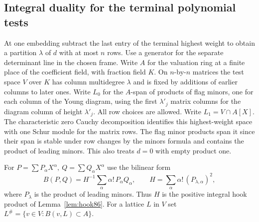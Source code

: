 \documentclass[a4paper,11pt]{article}
\theoremstyle{definition}
\theoremstyle{remark}
\numberwithin{equation}{section}
\begin{document}
\subsection{Integral duality for the terminal polynomial tests}\label{nav:V-66}
At one embedding subtract the last entry of the terminal
highest weight to obtain a partition \(\lambda\) of \(d\)
with at most \(n\) rows. Use a generator for the separate
determinant line in the chosen frame. Write \(A\) for the
valuation ring at a finite place of the coefficient field,
with fraction field \(K\). On \(n\)-by-\(n\) matrices the
test space \(V\) over \(K\) has column multidegree
\(\lambda\) and is fixed by additions of earlier columns to
later ones. Write \(L_0\) for the \(A\)-span of products of
flag minors, one for each column of the Young diagram,
using the first \(\lambda'_j\) matrix columns for the
diagram column of height \(\lambda'_j\). All row choices
are allowed. Write \(L_1=V\cap A[X]\). The characteristic
zero Cauchy decomposition identifies this highest-weight
space with one Schur module for the matrix rows. The flag
minor products span it since their span is stable under row
changes by the minors formula and contains the product of
leading minors. This also treats \(d=0\) with empty product one.

For \(P=\sum P_\alpha X^\alpha,\ Q=\sum Q_\alpha X^\alpha\)
use the bilinear form
\[
 B(P,Q)=H^{-1}\sum_\alpha \alpha!\,P_\alpha Q_\alpha,
 \qquad H=\sum_\alpha\alpha!\,(P_{\lambda,\alpha})^2 ,
\]
where \(P_\lambda\) is the product of leading minors.
Thus \(H\) is the positive integral hook product of
Lemma~\ref{lem:hook86}. For a lattice \(L\) in \(V\) set
\(L^\#=\{v\in V:B(v,L)\subset A\}\).
\end{document}
